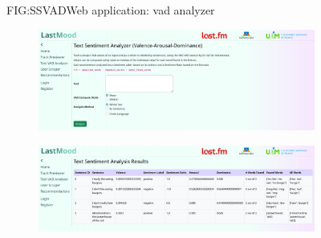 \begin{figure}[Web application: VAD analyzer]{FIG:SSVAD}{Web application: \acs{vad} analyzer}
    \begin{subfigure}[SBFIG:SSVADForm]{\acs{vad} analyzer form}{\includegraphics[width=1\textwidth]{img/SSVADForm.png}}
    \end{subfigure}
    \begin{subfigure}[SBFIG:SSVAD]{Example analysis by sentences}{\includegraphics[width=1\textwidth]{img/SSVAD.png}}
    \end{subfigure}
\end{figure}


